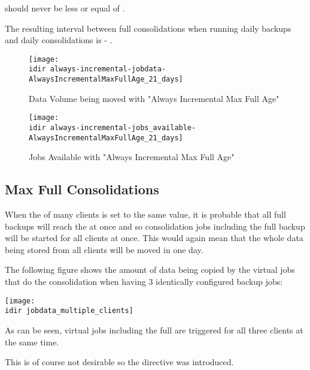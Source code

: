  should never be less or equal of .

The resulting interval between full consolidations when running daily backups
and daily consolidations is  - .

\begin{figure}[htbp]
\centering
\texttt{[image: \\idir always-incremental-jobdata-AlwaysIncrementalMaxFullAge\_21\_days]}
\caption{Data Volume being moved with "Always Incremental Max Full Age"}
\end{figure}%

\begin{figure}[htbp]
\centering
\texttt{[image: \\idir always-incremental-jobs\_available-AlwaysIncrementalMaxFullAge\_21\_days]}
\caption{Jobs Available with "Always Incremental Max Full Age"}
\end{figure}%

\subsection{Max Full Consolidations}
\label{sec:MaxFullConsolidations}

When the  of many clients is set to the same value,
it is probable that all full backups will reach the  at once
and so consolidation jobs including the full backup will be started for all clients at once.
This would again mean that the whole data being stored from all clients will be moved in one day.

The following figure shows the amount of data being copied by the virtual jobs that do the consolidation when having 3 identically configured backup jobs:

\begin{center}
\texttt{[image: \\idir jobdata\_multiple\_clients]}
\end{center}

As can be seen, virtual jobs including the full are triggered for all three clients at the same time.

This is of course not desirable so the directive  was introduced.

